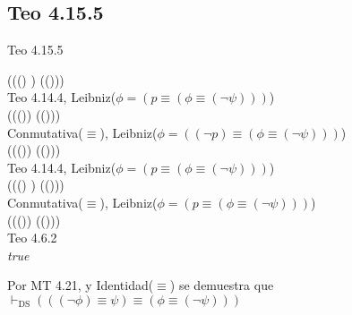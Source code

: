 \documentclass{article}
\begin{document}
\subsection{Teo 4.15.5}
\begin{logicenv}{Teo 4.15.5}
    \begin{derivation}
            (((\neg \phi) \equiv \psi) \equiv (\phi \equiv (\neg \psi)))\\
        Teo 4.14.4, Leibniz($\phi = (p \equiv (\phi \equiv (\neg \psi)))$)\\
            ((\neg (\phi \equiv \psi)) \equiv (\phi \equiv (\neg \psi)))\\
        Conmutativa($\equiv$), Leibniz($\phi = ((\neg p) \equiv (\phi \equiv (\neg \psi)))$)\\
            ((\neg (\psi \equiv \phi)) \equiv (\phi \equiv (\neg \psi)))\\
        Teo 4.14.4, Leibniz($\phi = (p \equiv (\phi \equiv (\neg \psi)))$)\\
            (((\neg \psi) \equiv \phi) \equiv (\phi \equiv (\neg \psi)))\\
        Conmutativa($\equiv$), Leibniz($\phi = (p \equiv (\phi \equiv (\neg \psi)))$)\\
            ((\phi \equiv (\neg \psi)) \equiv (\phi \equiv (\neg \psi)))\\
        Teo 4.6.2\\
            \textrm{\textit{true}}
    \end{derivation}
    Por MT 4.21, y Identidad($\equiv$) se demuestra que\\
    $\vdash_{\text{DS}} (((\neg \phi) \equiv \psi) \equiv (\phi \equiv (\neg \psi)))$
\end{logicenv}
\end{document}
